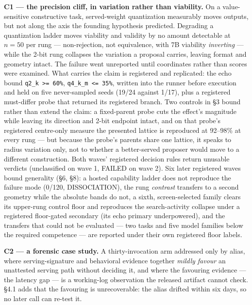 \textbf{C1 --- the precision cliff, in variation rather than viability.} On a value-sensitive constructive task, served-weight quantization measurably moves outputs, but not along the axis the founding hypothesis predicted. Degrading a quantization ladder moves viability and validity by no amount detectable at $n = 50$ per rung --- non-rejection, not equivalence, with 7B viability \emph{inverting} --- while the 2-bit rung collapses the variation a proposal carries, leaving format and geometry intact. The failure went unreported until coordinates rather than scores were examined. What carries the claim is registered and replicated: the echo bound \texttt{q2\_k >= 60\%}, \texttt{q4\_k\_m <= 35\%}, written into the runner before execution and held on five never-sampled seeds (19/24 against 1/17), plus a registered must-differ probe that returned its registered branch. Two controls in \S3 bound rather than extend the claim: a fixed-parent probe cuts the effect's magnitude while leaving its direction and 2-bit endpoint intact, and on that probe's registered centre-only measure the presented lattice is reproduced at 92--98\% at every rung --- but because the probe's parents share one lattice, it speaks to radius variation only, not to whether a better-served proposer would move to a different construction. Both waves' registered decision rules return unusable verdicts (unclassified on wave 1, FAILED on wave 2). Six later registered waves bound generality (\S6, \S8): a hosted capability ladder does not reproduce the failure mode (0/120, DISSOCIATION), the rung \emph{contrast} transfers to a second geometry while the absolute bands do not, a sixth, screen-selected family clears its upper-rung control floor and reproduces the search-activity collapse under a registered floor-gated secondary (its echo primary underpowered), and the transfers that could not be evaluated --- two tasks and five model families below the required competence --- are reported under their own registered floor labels.

\textbf{C2 --- a forensic case study.} A thirty-invocation arm addressed only by alias, where serving-signature and behavioral evidence together \emph{mildly favour} an unattested serving path without deciding it, and where the favouring evidence --- the latency gap --- is a working-log observation the released artifact cannot check. \S4.1 adds that the favouring is unrecoverable: the alias drifted within six days, so no later call can re-test it.

